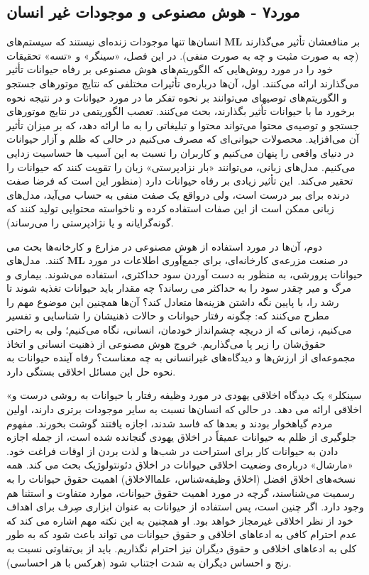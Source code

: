 \subsection*{مورد۷ - هوش مصنوعی و موجودات غیر انسان}
انسان‌ها تنها موجودات زنده‌ای نیستند که سیستم‌های \textenglish{\textbf{ML}} بر منافعشان تأثیر می‌گذارند (چه به صورت مثبت و چه به صورت منفی).
در این فصل، «سینگر» و «تسه» تحقیقات خود را در مورد روش‌هایی که الگوریتم‌های هوش مصنوعی بر رفاه حیوانات تأثیر می‌گذارند ارائه می‌کنند.
اول، آن‌ها درباره‌ی تأثیرات مختلفی که نتایج موتورهای جستجو و الگوریتم‌های توصیهای می‌توانند بر نحوه تفکر ما در مورد حیوانات و در نتیجه نحوه برخورد ما با حیوانات تأثیر بگذارند، بحث می‌کنند.
تعصب الگوریتمی در نتایج موتورهای جستجو و توصیه‌ی محتوا می‌تواند محتوا و تبلیغاتی را به ما ارائه دهد، که بر میزان تأثیر آن می‌افزاید.
محصولات حیوانی‌ای که مصرف می‌کنیم در حالی که ظلم و آزار حیوانات در دنیای واقعی را پنهان می‌کنیم و کاربران را نسبت به این آسیب ها حساسیت زدایی می‌کنیم.
مدل‌های زبانی، می‌توانند «بار نزادپرستی» زبان را تقویت کنند که حیوانات را تحقیر می‌کند.\     این تأثیر زیادی بر رفاه حیوانات دارد (منظور این است که فرضا صفت درنده برای ببر درست است، ولی درواقع یک صفت منفی به حساب می‌آید، مدل‌های زبانی ممکن است از این صفات استفاده کرده و ناخواسته محتوایی تولید کنند که گونه‌گرایانه و یا نژادپرستی را می‌رساند).

دوم، آن‌ها در مورد استفاده از هوش مصنوعی در مزارع و کارخانه‌ها بحث می کنند.\     مدل‌های \textenglish{\textbf{ML}} در صنعت مزرعه‌ی کارخانه‌ای، برای جمع‌آوری اطلاعات در مورد حیوانات پرورشی، به منظور به دست آوردن سود حداکثری، استفاده می‌شوند.
بیماری و مرگ و میر چقدر سود را به حداکثر می رساند؟ چه مقدار باید حیوانات تغذیه شوند تا رشد را، با پایین نگه داشتن هزینه‌ها متعادل کند؟ آن‌ها همچنین این موضوع مهم را مطرح می‌کنند که: چگونه رفتار حیوانات و حالات ذهنیشان را شناسایی و تفسیر می‌کنیم، زمانی که از دریچه چشم‌انداز خودمان، انسانی، نگاه می‌کنیم؛ ولی به راحتی حقوق‌شان را زیر پا می‌گذاریم.
خروج هوش مصنوعی از ذهنیت انسانی و اتخاذ مجموعه‌ای از ارزش‌ها و دیدگاه‌های غیرانسانی به چه معناست؟ رفاه آینده حیوانات به نحوه حل این مسائل اخلاقی بستگی دارد.

«سینکلر» یک دیدگاه اخلاقی یهودی در مورد وظیفه رفتار با حیوانات به روشی درست و اخلاقی ارائه می دهد.
در حالی که انسان‌ها نسبت به سایر موجودات برتری دارند، اولین مردم گیاهخوار بودند و بعدها که فاسد شدند، اجازه یافتند گوشت بخورند.
مفهوم جلوگیری از ظلم به حیوانات عمیقاً در اخلاق یهودی گنجانده شده است، از جمله اجازه دادن به حیوانات کار برای استراحت در شب‌ها و لذت بردن از اوقات فراغت خود.
«مارشال» درباره‌ی وضعیت اخلاقی حیوانات در اخلاق دئونتولوژیک بحث می کند.
همه نسخه‌های اخلاق افضل (اخلاق وظیفه‌شناس، علماالاخلاق) اهمیت حقوق حیوانات را به رسمیت می‌شناسند، گرچه در مورد اهمیت حقوق حیوانات، موارد متفاوت و استثنا هم وجود دارد.
اگر چنین است، پس استفاده از حیوانات به عنوان ابزاری صِرف برای اهداف خود از نظر اخلاقی غیرمجاز خواهد بود.
او همچنین به این نکته مهم اشاره می کند که عدم احترام کافی به ادعاهای اخلاقی و حقوق حیوانات می تواند باعث شود که به طور کلی به ادعاهای اخلاقی و حقوق دیگران نیز احترام نگذاریم.
باید از بی‌تفاوتی نسبت به رنج و احساس دیگران به شدت اجتناب شود (هرکس با هر احساسی).

